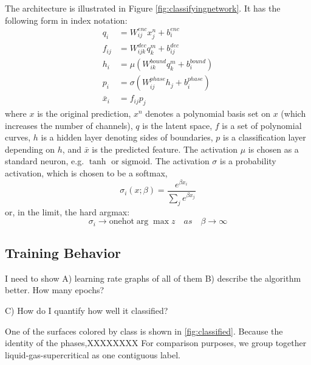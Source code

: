 \documentclass[AMA,STIX1COL]{WileyNJD-v2}
\begin{document}
The architecture is illustrated in Figure \ref{fig:classifyingnetwork}.
It has the following form in index notation:
\begin{align}
  q_i &= W^{enc}_{ij} x^n_j + b^{enc}_i\\
  f_{ij} &= W^{dec}_{ijk} q^m_k + b^{dec}_{ij} \\
  h_i &= \mu\left(W^{bound}_{ik}q^m_k+b^{bound}_{i}\right) \\
  p_i &= \sigma\left(W^{phase}_{ij}h_j+b^{phase}_i\right) \\
  \bar{x}_i&= f_{ij} p_j
\end{align}
where $x$ is the original prediction, $x^n$ denotes a polynomial basis
set on $x$ (which increases the number of channels), $q$ is the latent
space, $f$ is a set of polynomial curves, $h$ is a hidden layer
denoting sides of boundaries, $p$ is a classification layer depending
on $h$, and $\bar{x}$ is the predicted feature. The activation $\mu$
is chosen as a standard neuron, e.g. $\tanh$ or $\text{sigmoid}$. The
activation $\sigma$ is a probability activation, which is chosen to be
a softmax,
\begin{equation}
\sigma_i(x;\beta) = \frac{e^{\beta x_i}}{\sum_j e^{\beta x_j}}
\end{equation}
or, in the limit, the hard argmax:
\begin{equation}
\sigma_i \rightarrow \text{onehot}\arg\max z \quad as\quad  \beta\rightarrow\infty
\end{equation}



\subsection{Training Behavior}

I need to show A) learning rate graphs of all of them
B) describe the algorithm better. How many epochs?

C) How do I quantify how well it classified?

One of the surfaces colored by class is shown in
\ref{fig:classified}. 
Because the identity of the phases,XXXXXXXX
For comparison purposes, we group together liquid-gas-supercritical as one contiguous label.
\end{document}
